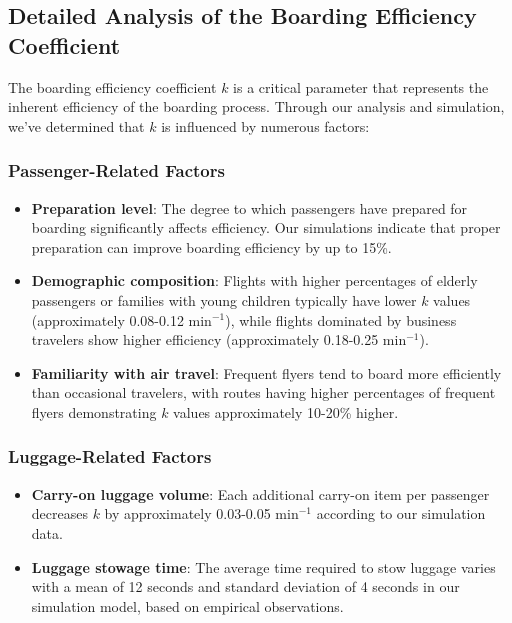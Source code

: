 \documentclass[12pt,a4paper]{article}
\begin{document}
\subsection{Detailed Analysis of the Boarding Efficiency Coefficient}
The boarding efficiency coefficient $k$ is a critical parameter that represents the inherent efficiency of the boarding process. Through our analysis and simulation, we've determined that $k$ is influenced by numerous factors:

\subsubsection{Passenger-Related Factors}
\begin{itemize}
\item \textbf{Preparation level}: The degree to which passengers have prepared for boarding significantly affects efficiency. Our simulations indicate that proper preparation can improve boarding efficiency by up to 15\%.

\item \textbf{Demographic composition}: Flights with higher percentages of elderly passengers or families with young children typically have lower $k$ values (approximately 0.08-0.12 min$^{-1}$), while flights dominated by business travelers show higher efficiency (approximately 0.18-0.25 min$^{-1}$).

\item \textbf{Familiarity with air travel}: Frequent flyers tend to board more efficiently than occasional travelers, with routes having higher percentages of frequent flyers demonstrating $k$ values approximately 10-20\% higher.
\end{itemize}

\subsubsection{Luggage-Related Factors}
\begin{itemize}
\item \textbf{Carry-on luggage volume}: Each additional carry-on item per passenger decreases $k$ by approximately 0.03-0.05 min$^{-1}$ according to our simulation data.

\item \textbf{Luggage stowage time}: The average time required to stow luggage varies with a mean of 12 seconds and standard deviation of 4 seconds in our simulation model, based on empirical observations.
\end{itemize}
\end{document}
